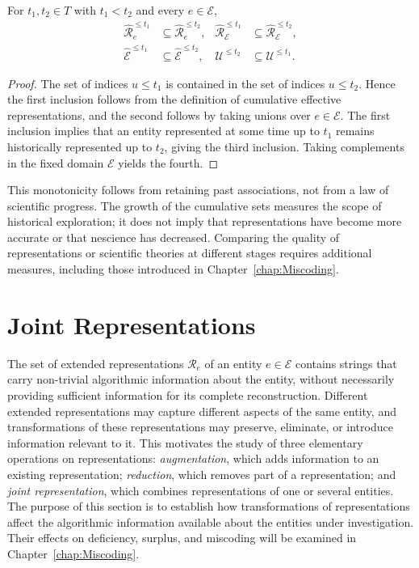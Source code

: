 \begin{proposition}
\label{prop:effective_representations_monotonicity}
For $t_1,t_2\in T$ with $t_1<t_2$ and every $e\in\mathcal E$,
\[
\begin{aligned}
\hat{\mathcal R}_e^{\leq t_1}&\subseteq\hat{\mathcal R}_e^{\leq t_2},
&\hat{\mathcal R}_{\mathcal E}^{\leq t_1}&\subseteq\hat{\mathcal R}_{\mathcal E}^{\leq t_2},\\
\hat{\mathcal E}^{\leq t_1}&\subseteq\hat{\mathcal E}^{\leq t_2},
&\mathcal U^{\leq t_2}&\subseteq\mathcal U^{\leq t_1}.
\end{aligned}
\]
\end{proposition}
\begin{proof}
The set of indices $u\leq t_1$ is contained in the set of indices $u\leq t_2$. Hence the first inclusion follows from the definition of cumulative effective representations, and the second follows by taking unions over $e\in\mathcal E$. The first inclusion implies that an entity represented at some time up to $t_1$ remains historically represented up to $t_2$, giving the third inclusion. Taking complements in the fixed domain $\mathcal E$ yields the fourth.
\end{proof}

This monotonicity follows from retaining past associations, not from a law of scientific progress. The growth of the cumulative sets measures the scope of historical exploration; it does not imply that representations have become more accurate or that nescience has decreased. Comparing the quality of representations or scientific theories at different stages requires additional measures, including those introduced in Chapter~\ref{chap:Miscoding}.


%
%

\section{Joint Representations}
\label{sec:joint_representations}

The set of extended representations $\mathcal{R}_e$ of an entity $e\in\mathcal{E}$ contains strings that carry non-trivial algorithmic information about the entity, without necessarily providing sufficient information for its complete reconstruction. Different extended representations may capture different aspects of the same entity, and transformations of these representations may preserve, eliminate, or introduce information relevant to it. This motivates the study of three elementary operations on representations: \emph{augmentation}, which adds information to an existing representation; \emph{reduction}, which removes part of a representation; and \emph{joint representation}, which combines representations of one or several entities. The purpose of this section is to establish how transformations of representations affect the algorithmic information available about the entities under investigation. Their effects on deficiency, surplus, and miscoding will be examined in Chapter~\ref{chap:Miscoding}.

